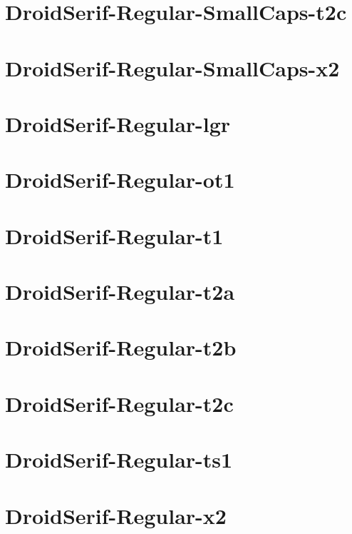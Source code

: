 \documentclass{article}
\begin{document}
\section{DroidSerif-Regular-SmallCaps-t2c}

\section{DroidSerif-Regular-SmallCaps-x2}

\section{DroidSerif-Regular-lgr}

\section{DroidSerif-Regular-ot1}

\section{DroidSerif-Regular-t1}

\section{DroidSerif-Regular-t2a}

\section{DroidSerif-Regular-t2b}

\section{DroidSerif-Regular-t2c}

\section{DroidSerif-Regular-ts1}

\section{DroidSerif-Regular-x2}
\end{document}
